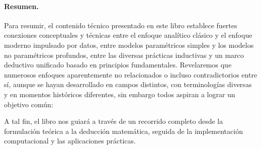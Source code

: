 \documentclass[../../book-main.tex]{subfiles}
\begin{document}
\paragraph{Resumen.}
Para resumir, el contenido técnico presentado en este libro
establece fuertes conexiones conceptuales y técnicas entre
el enfoque analítico clásico y el enfoque moderno impulsado por
datos, entre modelos paramétricos simples y los modelos
no paramétricos profundos, entre las diversas prácticas inductivas
y un marco deductivo unificado basado en principios fundamentales.
Revelaremos que numerosos enfoques aparentemente no relacionados
o incluso contradictorios entre sí, aunque se hayan desarrollado en 
campos distintos, con terminologías diversas y en momentos históricos diferentes,
sin embargo todos aspiran a lograr un objetivo común:
\begin{quote}
\end{quote}
A tal fin, el libro nos guiará a través de un recorrido completo desde
la formulación teórica a la deducción matemática, seguida de la 
implementación computacional y las aplicaciones prácticas.
\end{document}
